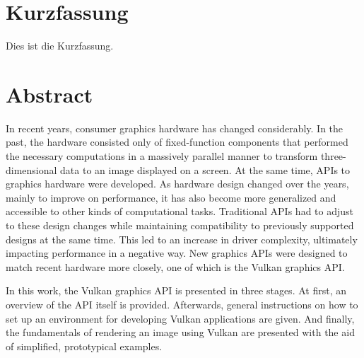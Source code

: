 
{
\chapter*{Kurzfassung}
\label{Abstract_de}
  Dies ist die Kurzfassung.


\newpage
}
{}

\chapter*{Abstract}
\label{Abstract}
  In recent years, consumer graphics hardware has changed considerably.
  In the past, the hardware consisted only of fixed-function components that performed the necessary computations in a massively parallel manner to transform three-dimensional data to an image displayed on a screen.
  At the same time, APIs to graphics hardware were developed.
  As hardware design changed over the years, mainly to improve on performance, it has also become more generalized and accessible to other kinds of computational tasks.
  Traditional APIs had to adjust to these design changes while maintaining compatibility to previously supported designs at the same time.
  This led to an increase in driver complexity, ultimately impacting performance in a negative way.
  New graphics APIs were designed to match recent hardware more closely, one of which is the Vulkan graphics API.

  In this work, the Vulkan graphics API is presented in three stages.
  At first, an overview of the API itself is provided.
  Afterwards, general instructions on how to set up an environment for developing Vulkan applications are given.
  And finally, the fundamentals of rendering an image using Vulkan are presented with the aid of simplified, prototypical examples.
